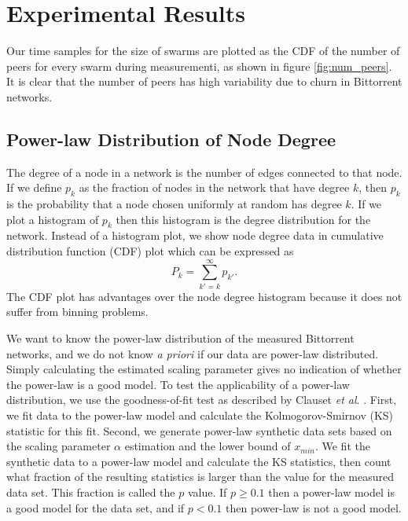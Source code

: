 \documentclass[paper]{ieice}
\begin{document}
\section{Experimental Results}\label{result}
Our time samples for the size of swarms are plotted as the CDF of the number of peers for every swarm during measurementi, as shown in figure \ref{fig:num_peers}. 
It is clear that the number of peers has  high variability due to churn in Bittorrent networks. 

\subsection{Power-law Distribution of Node Degree}
The degree of a node in a network is the number of edges connected to that node. 
If we define $p_k$ as the  fraction of nodes in the network that have degree $k$, then $p_k$ is the probability that a node chosen uniformly at random has degree $k$. 
If we plot a histogram of $p_k$ then this histogram is the degree distribution for  the network. 
Instead of a histogram plot,  we show node degree data in cumulative distribution  function (CDF) plot which can be expressed as
\begin{equation}
P_k = \sum_{k'=k}^{\infty} p_{k'}.
\end{equation}
The CDF plot has advantages over the node degree histogram because it does not suffer from binning problems.  %

We want to know the power-law distribution of the measured Bittorrent networks, and we do not know \textit{a priori} if our data are power-law distributed.
Simply calculating the estimated scaling parameter gives no indication of whether the power-law is a good model.  
To test the applicability of a power-law distribution, we use the goodness-of-fit test as described by Clauset \textit{et al}. \cite{clauset2009power}. 
First, we fit data to the power-law model and calculate the Kolmogorov-Smirnov (KS) statistic for this fit. 
Second, we generate power-law synthetic data sets based on the scaling parameter $\alpha$ estimation and the lower bound of $x_{min}$. 
We fit the synthetic data to a power-law model and calculate the KS statistics, then count what fraction of the resulting statistics is larger than the value for the measured data set. 
This fraction is called the $p$ value.  
If $p \geq 0.1$ then a power-law model is a good model for the data set, and if $p < 0.1$ then power-law is not a good model.
\end{document}
